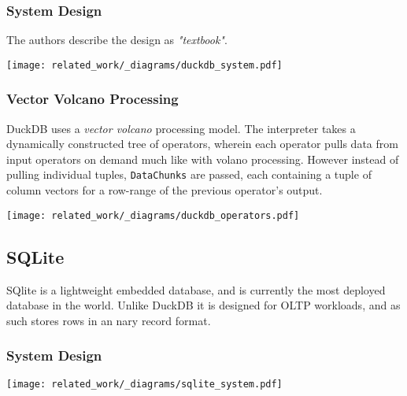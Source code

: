 \subsubsection{System Design}
The authors describe the design as \textit{"textbook"}\cite{DuckDBPaper}.
\begin{center}
    \texttt{[image: related\_work/\_diagrams/duckdb\_system.pdf]}
\end{center}
\subsubsection{Vector Volcano Processing}
DuckDB uses a \textit{vector volcano} processing model. The interpreter takes a dynamically constructed tree of operators, wherein each operator pulls data from input operators on demand much like with volano processing.
However instead of pulling individual tuples, \texttt{DataChunks} are passed, each containing a tuple of column vectors for a row-range of the previous operator's output.
\begin{center}
    \texttt{[image: related\_work/\_diagrams/duckdb\_operators.pdf]}
\end{center}


\subsection{SQLite}
SQlite is a lightweight embedded database\cite{SQLitePaper}, and is currently the most deployed database in the world\cite{SQLiteWebsite}.
Unlike DuckDB it is designed for OLTP workloads, and as such stores rows in an nary record format.
\subsubsection{System Design}
\begin{center}
    \texttt{[image: related\_work/\_diagrams/sqlite\_system.pdf]}
\end{center}

